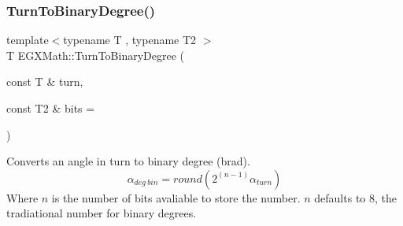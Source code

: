 \subsubsection{\texorpdfstring{Turn\+To\+Binary\+Degree()}{TurnToBinaryDegree()}}
{\footnotesize\ttfamily template$<$typename T , typename T2 $>$ \\
T E\+G\+X\+Math\+::\+Turn\+To\+Binary\+Degree (\begin{DoxyParamCaption}\item[{const T \&}]{turn,  }\item[{const T2 \&}]{bits = {} }\end{DoxyParamCaption})}



Converts an angle in turn to binary degree (brad). \[\alpha_{deg\ bin}=round(2^{(n-1)}\alpha_{turn})\] Where $n$ is the number of bits avaliable to store the number. $n$ defaults to 8, the tradiational number for binary degrees. 

